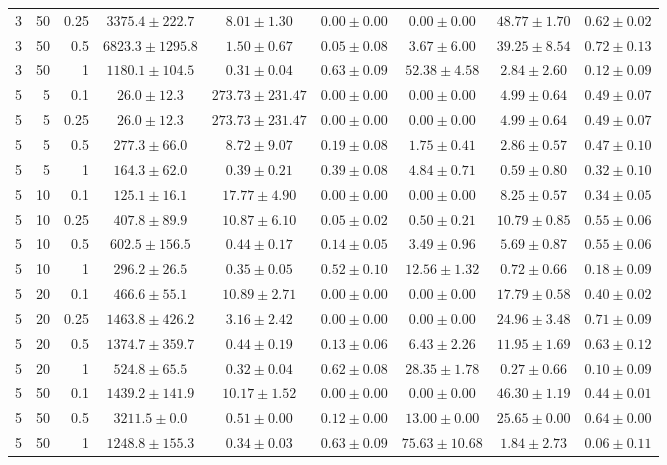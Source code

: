 \begin{table}[htbp]
\begin{tabular}{@{}rrrcccccc@{}}
3 & 50 & 0.25 & $3375.4 \pm 222.7$ & $8.01 \pm 1.30$ & $0.00 \pm 0.00$ & $0.00 \pm 0.00$ & $48.77 \pm 1.70$ & $0.62 \pm 0.02$ \\
3 & 50 & 0.5 & $6823.3 \pm 1295.8$ & $1.50 \pm 0.67$ & $0.05 \pm 0.08$ & $3.67 \pm 6.00$ & $39.25 \pm 8.54$ & $0.72 \pm 0.13$ \\
3 & 50 & 1 & $1180.1 \pm 104.5$ & $0.31 \pm 0.04$ & $0.63 \pm 0.09$ & $52.38 \pm 4.58$ & $2.84 \pm 2.60$ & $0.12 \pm 0.09$ \\
\midrule
5 & 5 & 0.1 & $26.0 \pm 12.3$ & $273.73 \pm 231.47$ & $0.00 \pm 0.00$ & $0.00 \pm 0.00$ & $4.99 \pm 0.64$ & $0.49 \pm 0.07$ \\
5 & 5 & 0.25 & $26.0 \pm 12.3$ & $273.73 \pm 231.47$ & $0.00 \pm 0.00$ & $0.00 \pm 0.00$ & $4.99 \pm 0.64$ & $0.49 \pm 0.07$ \\
5 & 5 & 0.5 & $277.3 \pm 66.0$ & $8.72 \pm 9.07$ & $0.19 \pm 0.08$ & $1.75 \pm 0.41$ & $2.86 \pm 0.57$ & $0.47 \pm 0.10$ \\
5 & 5 & 1 & $164.3 \pm 62.0$ & $0.39 \pm 0.21$ & $0.39 \pm 0.08$ & $4.84 \pm 0.71$ & $0.59 \pm 0.80$ & $0.32 \pm 0.10$ \\
5 & 10 & 0.1 & $125.1 \pm 16.1$ & $17.77 \pm 4.90$ & $0.00 \pm 0.00$ & $0.00 \pm 0.00$ & $8.25 \pm 0.57$ & $0.34 \pm 0.05$ \\
5 & 10 & 0.25 & $407.8 \pm 89.9$ & $10.87 \pm 6.10$ & $0.05 \pm 0.02$ & $0.50 \pm 0.21$ & $10.79 \pm 0.85$ & $0.55 \pm 0.06$ \\
5 & 10 & 0.5 & $602.5 \pm 156.5$ & $0.44 \pm 0.17$ & $0.14 \pm 0.05$ & $3.49 \pm 0.96$ & $5.69 \pm 0.87$ & $0.55 \pm 0.06$ \\
5 & 10 & 1 & $296.2 \pm 26.5$ & $0.35 \pm 0.05$ & $0.52 \pm 0.10$ & $12.56 \pm 1.32$ & $0.72 \pm 0.66$ & $0.18 \pm 0.09$ \\
5 & 20 & 0.1 & $466.6 \pm 55.1$ & $10.89 \pm 2.71$ & $0.00 \pm 0.00$ & $0.00 \pm 0.00$ & $17.79 \pm 0.58$ & $0.40 \pm 0.02$ \\
5 & 20 & 0.25 & $1463.8 \pm 426.2$ & $3.16 \pm 2.42$ & $0.00 \pm 0.00$ & $0.00 \pm 0.00$ & $24.96 \pm 3.48$ & $0.71 \pm 0.09$ \\
5 & 20 & 0.5 & $1374.7 \pm 359.7$ & $0.44 \pm 0.19$ & $0.13 \pm 0.06$ & $6.43 \pm 2.26$ & $11.95 \pm 1.69$ & $0.63 \pm 0.12$ \\
5 & 20 & 1 & $524.8 \pm 65.5$ & $0.32 \pm 0.04$ & $0.62 \pm 0.08$ & $28.35 \pm 1.78$ & $0.27 \pm 0.66$ & $0.10 \pm 0.09$ \\
5 & 50 & 0.1 & $1439.2 \pm 141.9$ & $10.17 \pm 1.52$ & $0.00 \pm 0.00$ & $0.00 \pm 0.00$ & $46.30 \pm 1.19$ & $0.44 \pm 0.01$ \\
5 & 50 & 0.5 & $3211.5 \pm 0.0$ & $0.51 \pm 0.00$ & $0.12 \pm 0.00$ & $13.00 \pm 0.00$ & $25.65 \pm 0.00$ & $0.64 \pm 0.00$ \\
5 & 50 & 1 & $1248.8 \pm 155.3$ & $0.34 \pm 0.03$ & $0.63 \pm 0.09$ & $75.63 \pm 10.68$ & $1.84 \pm 2.73$ & $0.06 \pm 0.11$ \\
\bottomrule
\end{tabular}
\end{table}
